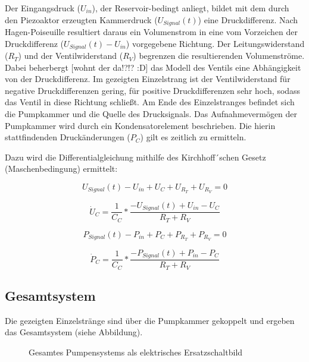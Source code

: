 \documentclass[fontsize=12pt, a4paper]{scrartcl}
\begin{document}
Der Eingangsdruck ($U_{in}$), der Reservoir-bedingt anliegt, bildet mit dem durch den Piezoaktor erzeugten Kammerdruck ($U_{Signal}(t)$) eine Druckdifferenz. Nach Hagen-Poiseuille resultiert daraus ein Volumenstrom in eine vom Vorzeichen der Druckdifferenz ($U_{Signal}(t)-U_{in}$) vorgegebene Richtung. Der Leitungswiderstand ($R_{T}$) und der Ventilwiderstand ($R_{V}$) begrenzen die resultierenden Volumenströme. Dabei beherbergt [wohnt der da!?!? :D] das Modell des Ventils eine Abhängigkeit von der Druckdifferenz. Im gezeigten Einzelstrang ist der Ventilwiderstand für negative Druckdifferenzen gering, für positive Druckdifferenzen sehr hoch, sodass das Ventil in diese Richtung schließt. Am Ende des Einzelstranges befindet sich die Pumpkammer und die Quelle des Drucksignals. Das Aufnahmevermögen der Pumpkammer wird durch ein Kondensatorelement beschrieben. Die hierin stattfindenden Druckänderungen ($P_{C}$) gilt es zeitlich zu ermitteln.

Dazu wird die Differentialgleichung mithilfe des Kirchhoff´schen Gesetz (Maschenbedingung) ermittelt:

\begin{equation}
	U_{Signal}(t) - U_{in} + U_{C} + U_{R_{T}} + U_{R_{V}} = 0
\end{equation}

\begin{equation}
	\dot{U}_{C} = \frac{1}{C_{C}} * \frac{-U_{Signal}(t)+U_{in}-U_{C}}{R_{T}+R_{V}}
\end{equation}

\begin{equation}
	P_{Signal}(t) - P_{in} + P_{C} + P_{R_{T}} + P_{R_{V}} = 0
\end{equation}

\begin{equation}
	\dot{P}_{C} = \frac{1}{C_{C}} * \frac{-P_{Signal}(t)+P_{in}-P_{C}}{R_{T}+R_{V}}
\end{equation}


\subsection{Gesamtsystem}

Die gezeigten Einzelstränge sind über die Pumpkammer gekoppelt und ergeben das Gesamtsystem (siehe Abbildung).


\begin{figure}[H]
	
	\caption{Gesamtes Pumpensystems als elektrisches Ersatzschaltbild}
	\label{systemcircuit}
\end{figure}
\end{document}
